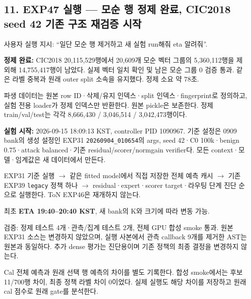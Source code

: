 \subsection{11. EXP47 실행 — 모순 행 정제 완료, CIC2018 seed 42 기존 구조 재검증 시작}
사용자 실행 지시: “일단 모순 행 제거하고 새 실험 run해줘 eta 알려줘”.

\par\noindent \textbullet\enspace \textbf{정제 완료:} CIC2018 20,115,529행에서 20,609개 모순 벡터 그룹의 5,360,112행을 제외해 14,755,417행이 남았다. 실제 벡터 일치 확인 및 남은 모순 그룹 0 검증 통과. 같은 라벨 중복과 원래 outer split 소속을 유지했다. 정제 소요 약 78초.


\par\noindent \textbullet\enspace 파생 데이터는 원본 row ID·삭제/\allowbreak{}유지 인덱스·split 인덱스·fingerprint로 정의하고, 실험 전용 loader가 정제 인덱스만 반환한다. 원본 pickle은 보존한다. 정제 train/\allowbreak{}val/\allowbreak{}test는 각각 8,666,430 /\allowbreak{} 3,046,514 /\allowbreak{} 3,042,473행이다.


\par\noindent \textbullet\enspace \textbf{실험 시작:} 2026-09-15 18:09:13 KST, controller PID 1090967. 기준 설정은 0909 bank의 생성 설정인 EXP31 \texttt{20260904\allowbreak{}\_\allowbreak{}\allowbreak{}010654}의 args, seed 42·C0 100k·benign 0.75·attack balanced·기존 residual/\allowbreak{}scorer/\allowbreak{}normgain verifier다. 모든 context·모델·임계값은 새 데이터에서 만든다.


\par\noindent \textbullet\enspace EXP31 기준 실행  \ensuremath{\rightarrow}  같은 fitted model에서 직접 저장한 전체 예측 캐시  \ensuremath{\rightarrow}  기존 EXP39 \texttt{legacy} 정책 하나  \ensuremath{\rightarrow}  residual·expert·scorer target·라우팅 단계 진단 순으로 실행한다. ToN EXP46은 재개하지 않는다.


\par\noindent \textbullet\enspace 최초 \textbf{ETA 19:40–20:40 KST}, 새 bank의 K와 크기에 따라 변동 가능.


\par\noindent \textbullet\enspace 검증: 정제 테스트 4개·관측/\allowbreak{}집계 테스트 2개, 전체 GPU 합성 smoke 통과. 원본 EXP31 소스는 변경하지 않았으며, 실행 사본에서 관측 callback 9개를 제거한 AST는 원본과 동일하다. 추가 dense 평가는 진단용이며 기존 정책의 최종 결정을 변경하지 않는다.


\par\noindent \textbullet\enspace Cal 전체 예측과 원래 선택 행 예측의 차이를 별도 기록한다. 합성 smoke에서는 후보 11/\allowbreak{}700행 차이, 최종 정책 라벨 차이 0이었다. 실제 실행도 해당 차이를 저장하고 원래 cal 점수로 원래 gate를 분석한다.


